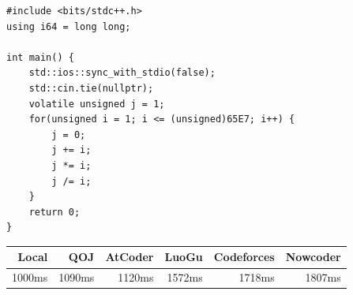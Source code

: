 \begin{lstlisting}[style=cppstyle]
#include <bits/stdc++.h>
using i64 = long long;

int main() {
    std::ios::sync_with_stdio(false);
    std::cin.tie(nullptr);
    volatile unsigned j = 1;
    for(unsigned i = 1; i <= (unsigned)65E7; i++) {
        j = 0;
        j += i;
        j *= i;
        j /= i;
    }
    return 0;
}
\end{lstlisting}
\begin{center}
    \begin{tabular}{|r|r|r|r|r|r|}
        \hline
        \rowcolor{gray!20}
        Local       & QOJ       & AtCoder   & LuoGu     & Codeforces    & Nowcoder  \\ \hline
        1000ms      & 1090ms    & 1120ms    & 1572ms    & 1718ms        & 1807ms   \\ \hline
    \end{tabular}\\
\end{center}
